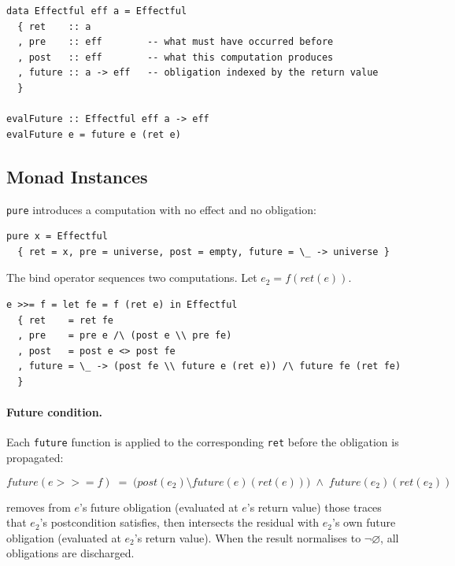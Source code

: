\documentclass[acmsmall,screen]{acmart}
\newcommand{\post}{\mathit{post}}
\newcommand{\fut}{\mathit{future}}
\newcommand{\ret}{\mathit{ret}}
\newcommand{\univ}{\neg\varnothing}
\begin{document}
\begin{lstlisting}
data Effectful eff a = Effectful
  { ret    :: a
  , pre    :: eff        -- what must have occurred before
  , post   :: eff        -- what this computation produces
  , future :: a -> eff   -- obligation indexed by the return value
  }

evalFuture :: Effectful eff a -> eff
evalFuture e = future e (ret e)
\end{lstlisting}

\subsection{Monad Instances}

\lstinline{pure} introduces a computation with no effect and no obligation:

\begin{lstlisting}
pure x = Effectful
  { ret = x, pre = universe, post = empty, future = \_ -> universe }
\end{lstlisting}

The bind operator sequences two computations.
Let $e_2 = f(\ret(e))$.

\begin{lstlisting}
e >>= f = let fe = f (ret e) in Effectful
  { ret    = ret fe
  , pre    = pre e /\ (post e \\ pre fe)
  , post   = post e <> post fe
  , future = \_ -> (post fe \\ future e (ret e)) /\ future fe (ret fe)
  }
\end{lstlisting}

\paragraph{Future condition.}
Each \lstinline{future} function is applied to the corresponding
\lstinline{ret} before the obligation is propagated:

\begin{equation}
  \fut(e \mathbin{>\!\!>\!\!=} f)
  \;=\;
  \bigl(\post(e_2) \setminus \fut(e)(\ret(e))\bigr)
  \;\wedge\;
  \fut(e_2)(\ret(e_2))
  \label{eq:future-bind}
\end{equation}

removes from $e$'s future obligation (evaluated at $e$'s return value)
those traces that $e_2$'s postcondition satisfies, then intersects the
residual with $e_2$'s own future obligation (evaluated at $e_2$'s return
value).
When the result normalises to $\univ$, all obligations are discharged.
\end{document}
